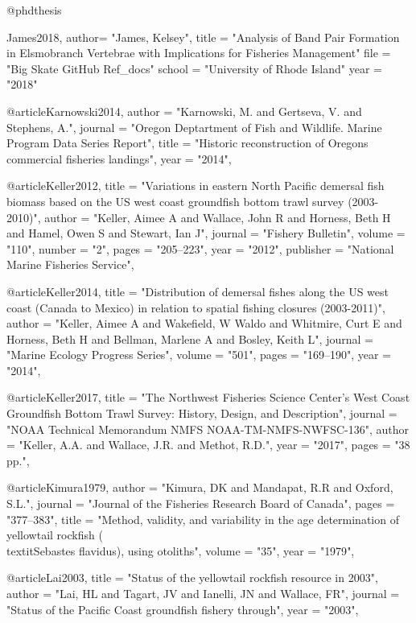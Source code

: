 @phdthesis{James2018,
    author= "{James, Kelsey}",
    title = "{Analysis of Band Pair Formation in Elsmobranch Vertebrae with Implications for Fisheries Management}"
    file = "{Big Skate GitHub Ref_docs}"
    school = "{University of Rhode Island}"
    year = "{2018}"

@article{Karnowski2014,
    author = "{Karnowski, M. and Gertseva, V. and Stephens, A.}",
    journal = "{Oregon Deptartment of Fish and Wildlife. Marine Program Data Series Report}",
    title = "{{Historic reconstruction of Oregons commercial fisheries landings}}",
    year = "{2014}",
}

@article{Keller2012,
    title = "{Variations in eastern North Pacific demersal fish biomass based on the US west coast groundfish bottom trawl survey (2003-2010)}",
    author = "{Keller, Aimee A and Wallace, John R and Horness, Beth H and Hamel, Owen S and Stewart, Ian J}",
    journal = "{Fishery Bulletin}",
    volume = "{110}",
    number = "{2}",
    pages = "{205--223}",
    year = "{2012}",
    publisher = "{National Marine Fisheries Service}",
}

@article{Keller2014,
    title = "{Distribution of demersal fishes along the US west coast (Canada to Mexico) in relation to spatial fishing closures (2003-2011)}",
    author = "{Keller, Aimee A and Wakefield, W Waldo and Whitmire, Curt E and Horness, Beth H and Bellman, Marlene A and Bosley, Keith L}",
    journal = "{Marine Ecology Progress Series}",
    volume = "{501}",
    pages = "{169--190}",
    year = "{2014}",
}

@article{Keller2017,
    title = "{The Northwest Fisheries Science Center's West Coast Groundfish Bottom Trawl Survey: History, Design, and Description}",
    journal = "{NOAA Technical Memorandum NMFS NOAA-TM-NMFS-NWFSC-136}",
    author = "{Keller, A.A. and Wallace, J.R. and Methot, R.D.}",
    year = "{2017}",
    pages = "{38 pp.}",
}

@article{Kimura1979,
    author = "{Kimura, DK and Mandapat, R.R and Oxford, S.L.}",
    journal = "{Journal of the Fisheries Research Board of Canada}",
    pages = "{377--383}",
    title = "{{Method, validity, and variability in the age determination of yellowtail rockfish (\\textit{{Sebastes} flavidus}), using otoliths}}",
    volume = "{35}",
    year = "{1979}",
}

@article{Lai2003,
    title = "{Status of the yellowtail rockfish resource in 2003}",
    author = "{Lai, HL and Tagart, JV and Ianelli, JN and Wallace, FR}",
    journal = "{Status of the Pacific Coast groundfish fishery through}",
    year = "{2003}",
}

}
